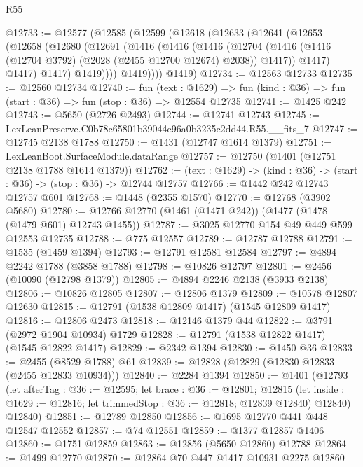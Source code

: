 \begin{lexlean}{R55}
\begin{coremodule}
{{@12733 := @12577
    (@12585
      (@12599
        (@12618
          (@12633
            (@12641
              (@12653
                (@12658
                  (@12680
                    (@12691
                      (@1416
                        (@1416
                          (@1416
                            (@12704
                              (@1416
                                (@1416 (@12704 @3792) (@2028 (@2455 @12700 @12674) @2038))
                                @1417))
                            @1417)
                          @1417)
                        @1417)
                      @1419))))
              @1419))))
      @1419)
@12734 := @12563 @12733
@12735 := @12560 @12734
@12740 := fun (text : @1629) =>
  fun (kind : @36) => fun (start : @36) => fun (stop : @36) => @12554 @12735
@12741 := @1425 @242
@12743 := @5650 (@2726 @2493)
@12744 := @12741 @12743
@12745 := LexLeanPreserve.C0b78c65801b39044e96a0b3235c2dd44.R55.__fits_7
@12747 := @12745 @2138 @1788
@12750 := @1431 (@12747 @1614 @1379)
@12751 := LexLeanBoot.SurfaceModule.dataRange
@12757 := @12750 (@1401 (@12751 @2138 @1788 @1614 @1379))
@12762 := (text : @1629) -> (kind : @36) -> (start : @36) -> (stop : @36) -> @12744 @12757
@12766 := @1442 @242 @12743 @12757 @601
@12768 := @1448 (@2355 @1570)
@12770 := @12768 (@3902 @5680)
@12780 := @12766 @12770 (@1461 (@1471 @242)) (@1477 (@1478 (@1479 @601) @12743 @1455))
@12787 := @3025 @12770 @154 @49 @449 @599 @12553 @12735
@12788 := @775 @12557
@12789 := @12787 @12788
@12791 := @1535 (@1459 @1394)
@12793 := @12791 @12581 @12584
@12797 := @4894 @2242 @1788 (@3858 @1788)
@12798 := @10826 @12797
@12801 := @2456 (@10090 (@12798 @1379))
@12805 := @4894 @2246 @2138 (@3933 @2138)
@12806 := @10826 @12805
@12807 := @12806 @1379
@12809 := @10578 @12807 @12630
@12815 := @12791 (@1538 @12809 @1417) (@1545 @12809 @1417)
@12816 := @12806 @2473
@12818 := @12146 @1379 @44
@12822 := @3791 (@2972 @1904 @10934) @1729
@12828 := @12791 (@1538 @12822 @1417) (@1545 @12822 @1417)
@12829 := @2342 @1394
@12830 := @1450 @36
@12833 := @2455 (@8529 @1788) @61
@12839 := @12828 (@12829 (@12830 @12833 (@2455 @12833 @10934)))
@12840 := @2284 @1394
@12850 := @1401
    (@12793
      (let afterTag : @36 := @12595;
      let brace : @36 := @12801;
      @12815 (let inside : @1629 := @12816; let trimmedStop : @36 := @12818; @12839 @12840) @12840)
      @12840)
@12851 := @12789 @12850
@12856 := @1695 @12770 @441 @448 @12547 @12552
@12857 := @74 @12551
@12859 := @1377 @12857 @1406
@12860 := @1751 @12859
@12863 := @12856 (@5650 @12860) @12788
@12864 := @1499 @12770
@12870 := @12864 @70 @447 @1417 @10931 @2275 @12860
}}
\end{coremodule}
\end{lexlean}
